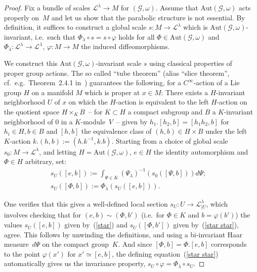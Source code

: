 \documentclass[pdftex]{sigma}
\def\Gbdle{\mathcal{G}}
\theoremstyle{plain}
\theoremstyle{definition}
\begin{document}
\begin{proof} Fix a bundle of scales $\mathcal{L}^{\lambda} \rightarrow M$ for $(\Gbdle,\omega)$. Assume that $\mathrm{Aut}(\Gbdle,\omega)$ acts properly on~$M$ and let us show that the parabolic structure is not essential. By def\/inition, it suf\/f\/ices to construct a global scale $s: M \rightarrow \mathcal{L}^{\lambda}$ which is $\mathrm{Aut}(\Gbdle,\omega)$-invariant, i.e.\ such that $\Phi_{\lambda} \circ s = s \circ \varphi$ holds for all $\Phi \in \mathrm{Aut}(\Gbdle,\omega)$ and $\Phi_{\lambda}: \mathcal{L}^{\lambda} \rightarrow \mathcal{L}^{\lambda}$, $\varphi: M \rightarrow M$ the induced dif\/feomorphisms.

 We construct this $\mathrm{Aut}(\Gbdle,\omega)$-invariant scale $s$ using classical properties of proper group actions. The so called ``tube theorem'' (alias ``slice theorem'', cf.\ e.g.\ Theorem~2.4.1 in~\cite{DuistKolk}) guarantees the following, for a $C^{\infty}$-action of a Lie group $H$ on a manifold $M$ which is proper at $x \in M$: There exists a $H$-invariant neighborhood $U$ of $x$ on which the $H$-action is equivalent to the left $H$-action on the quotient space $H \times_{K} B$~-- for $K \subset H$ a compact subgroup and $B$ a $K$-invariant neighborhood of $0$ in a $K$-module~$V$~-- given by $h_1.[h_2,b] = [h_1h_2,b]$ for $h_i \in H, b \in B$ and $[h,b]$ the equivalence class of $(h,b) \in H \times B$ under the left $K$-action $k.(h,b) := (h.k^{-1},k.b)$. Starting from a choice of global scale $s_0: M \rightarrow \mathcal{L}^{\lambda}$, and letting $H = \mathrm{Aut}(\Gbdle,\omega)$, $e \in H$ the identity automorphism and $\Phi \in H$ arbitrary, set:
\begin{gather}
s_{U}([e,b]) := \int_{\Psi \in K} (\Psi_{\lambda})^{-1}(s_0([\Psi,b]))d\Psi; \label{star}\\
s_U([\Phi,b]) := \Phi_{\lambda}(s_U([e,b])). \label{star star}
\end{gather}

 One verif\/ies that this gives a well-def\/ined local section $s_{U}: U \rightarrow \mathcal{L}^{\lambda}_{\vert U}$, which involves checking that for $(e,b) \sim (\Phi,b')$ (i.e.\ for $\Phi \in K$ and $b = \varphi(b')$) the values $s_U([e,b])$ given by~(\ref{star}) and $s_U([\Phi,b'])$ given by~(\ref{star star}), agree. This follows by unwinding the def\/initions, and using a bi-invariant Haar measure~$d\Psi$ on the compact group~$K$. And since $[\Phi,b] = \Phi.[e,b]$ corresponds to the point $\varphi(x')$ for $x' \simeq [e,b]$, the def\/ining equation~(\ref{star star}) automatically gives us the invariance property, $s_U \circ \varphi = \Phi_{\lambda} \circ s_U$.


\end{proof}
\end{document}
